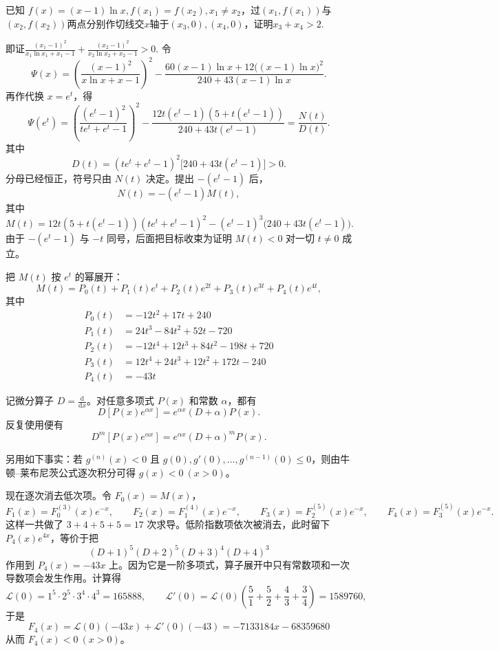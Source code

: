 \begin{example}[证明$x_3+x_4>2$]
已知 $f(x)=(x-1)\ln x,f(x_1)=f(x_2),x_1 \neq x_2$，过$(x_1,f(x_1))$与$(x_2,f(x_2))$两点分别作切线交$x$轴于$(x_3,0),(x_4,0)$，证明$x_3+x_4>2$.
\end{example}
\begin{solution}
即证$\displaystyle\frac{(x_1-1)^2}{x_1\ln x_1 + x_1 - 1} +\frac{(x_2-1)^2}{x_2\ln x_2 + x_2 - 1}> 0$.
令
\[
\Psi(x)=\left(\frac{(x-1)^2}{x\ln x+x-1}\right)^2-\frac{60(x-1)\ln x+12\bigl((x-1)\ln x\bigr)^2}{240+43(x-1)\ln x}.
\]
再作代换 $x=e^t$，得
$$ \Psi(e^t)=\left(\frac{(e^t-1)^2}{t e^t+e^t-1}\right)^2-\frac{12t(e^t-1)(5+t(e^t-1))}{240+43t(e^t-1)}=\frac{N(t)}{D(t)}. $$
其中
$$ D(t)=(t e^t+e^t-1)^2\bigl[240+43t(e^t-1)\bigr]>0. $$
分母已经恒正，符号只由 $N(t)$ 决定。提出 $-(e^t-1)$ 后，
$$ N(t)=-(e^t-1)M(t), $$
其中
$$ M(t)=12t(5+t(e^t-1))(t e^t+e^t-1)^2-(e^t-1)^3\bigl(240+43t(e^t-1)\bigr). $$
由于 $-(e^t-1)$ 与 $-t$ 同号，后面把目标收束为证明 $M(t)<0$ 对一切 $t\ne0$ 成立。

把 $M(t)$ 按 $e^t$ 的幂展开：
$$ M(t)=P_0(t)+P_1(t)e^t+P_2(t)e^{2t}+P_3(t)e^{3t}+P_4(t)e^{4t}, $$
其中
\begin{align*}
 P_0(t) &= -12t^2 + 17t + 240 \\
 P_1(t) &= 24t^3 - 84t^2 + 52t - 720 \\
 P_2(t) &= -12t^4 + 12t^3 + 84t^2 - 198t + 720 \\
 P_3(t) &= 12t^4 + 24t^3 + 12t^2 + 172t - 240 \\
 P_4(t) &= -43t
\end{align*}

记微分算子 $D=\frac{\mathrm{d}}{\mathrm{d}x}$。对任意多项式 $P(x)$ 和常数 $\alpha$，都有
\[
D[P(x)e^{\alpha x}] = e^{\alpha x}(D+\alpha)P(x).
\]
反复使用便有
\[
D^m[P(x)e^{\alpha x}] = e^{\alpha x}(D+\alpha)^m P(x).
\]

另用如下事实：若 $g^{(n)}(x)<0$ 且 $g(0),g'(0),\dots,g^{(n-1)}(0)\le0$，则由牛顿--莱布尼茨公式逐次积分可得 $g(x)<0\ (x>0)$。

现在逐次消去低次项。令 $F_0(x)=M(x)$，
\[
F_1(x)=F_0^{(3)}(x)e^{-x},\qquad
F_2(x)=F_1^{(4)}(x)e^{-x},\qquad
F_3(x)=F_2^{(5)}(x)e^{-x},\qquad
F_4(x)=F_3^{(5)}(x)e^{-x}.
\]
这样一共做了 $3+4+5+5=17$ 次求导。低阶指数项依次被消去，此时留下 $P_4(x)e^{4x}$，等价于把
\[
(D+1)^5 (D+2)^5 (D+3)^4 (D+4)^3
\]
作用到 $P_4(x)=-43x$ 上。因为它是一阶多项式，算子展开中只有常数项和一次导数项会发生作用。计算得
\[
\mathcal{L}(0)=1^5\cdot2^5\cdot3^4\cdot4^3=165888,\qquad
\mathcal{L}'(0)=\mathcal{L}(0)\left(\frac51+\frac52+\frac43+\frac34\right)=1589760,
\]
于是
$$ F_4(x) = \mathcal{L}(0)(-43x) + \mathcal{L}'(0)(-43) = -7133184x - 68359680 $$
从而 $F_4(x)<0\ (x>0)$。


\end{solution}
